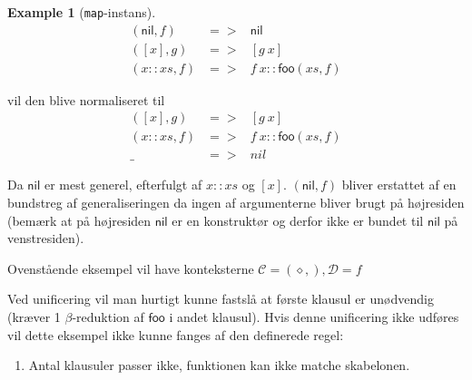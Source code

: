 \documentclass[oneside]{memoir}
\theoremstyle{definition}
\newtheorem{example}{Example}
\begin{document}
\begin{example}[\texttt{map}-instans]
  \begin{eqnarray*}
    (\mathsf{nil}, f) &=>& \mathsf{nil} \\
    ([x], g) &=>& [g\ x] \\
    (x::xs, f) &=>& f\ x  :: \mathsf{foo}(xs,f)
  \end{eqnarray*}

  vil den blive normaliseret til
  \begin{eqnarray*}
    ([x], g) &=>& [g\ x] \\
    (x::xs, f) &=>& f\ x  :: \mathsf{foo}(xs,f) \\
    \_ &=>& nil
  \end{eqnarray*}

  Da $\mathsf{nil}$ er mest generel, efterfulgt af $x::xs$ og $[x]$. $(\mathsf{nil}, f)$
  bliver erstattet af en bundstreg af generaliseringen da ingen af argumenterne
  bliver brugt på højresiden (bemærk at på højresiden $\mathsf{nil}$ er en
  konstruktør og derfor ikke er bundet til $\mathsf{nil}$ på venstresiden).

  Ovenstående eksempel vil have konteksterne $\mathcal{C} = (\diamond, ),
  \mathcal{D} = f$

  Ved unificering vil man hurtigt kunne fastslå at første klausul er unødvendig
  (kræver 1 $\beta$-reduktion af $\mathsf{foo}$ i andet klausul). Hvis denne
  unificering ikke udføres vil dette eksempel ikke kunne fanges af den
  definerede regel:

  \begin{enumerate}
  \item Antal klausuler passer ikke, funktionen kan ikke matche skabelonen.
  \end{enumerate}
\end{example}
\end{document}
